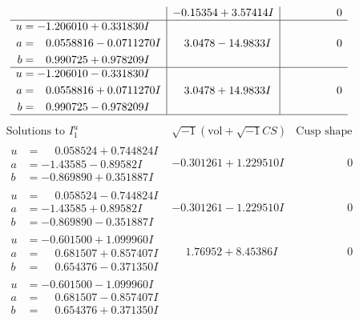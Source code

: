 \documentclass[1p]{elsarticle_modified}
\theoremstyle{definition}
\newcommand{\I}{\sqrt{-1}}
\begin{document}
$$\begin{array}{c|c|c}
 & -0.15354 + 3.57414 I & \phantom{-0.000000 } 0 \\ \hline\begin{aligned}
u &= -1.206010 + 0.331830 I \\
a &= \phantom{-}0.0558816 - 0.0711270 I \\
b &= \phantom{-}0.990725 + 0.978209 I\end{aligned}
 & \phantom{-}3.0478 - 14.9833 I & \phantom{-0.000000 } 0 \\ \hline\begin{aligned}
u &= -1.206010 - 0.331830 I \\
a &= \phantom{-}0.0558816 + 0.0711270 I \\
b &= \phantom{-}0.990725 - 0.978209 I\end{aligned}
 & \phantom{-}3.0478 + 14.9833 I & \phantom{-0.000000 } 0\\
 \hline 
 \end{array}$$\newpage$$\begin{array}{c|c|c}  
\text{Solutions to }I^u_{1}& \I (\text{vol} + \sqrt{-1}CS) & \text{Cusp shape}\\
 \hline 
\begin{aligned}
u &= \phantom{-}0.058524 + 0.744824 I \\
a &= -1.43585 - 0.89582 I \\
b &= -0.869890 + 0.351887 I\end{aligned}
 & -0.301261 + 1.229510 I & \phantom{-0.000000 } 0 \\ \hline\begin{aligned}
u &= \phantom{-}0.058524 - 0.744824 I \\
a &= -1.43585 + 0.89582 I \\
b &= -0.869890 - 0.351887 I\end{aligned}
 & -0.301261 - 1.229510 I & \phantom{-0.000000 } 0 \\ \hline\begin{aligned}
u &= -0.601500 + 1.099960 I \\
a &= \phantom{-}0.681507 + 0.857407 I \\
b &= \phantom{-}0.654376 - 0.371350 I\end{aligned}
 & \phantom{-}1.76952 + 8.45386 I & \phantom{-0.000000 } 0 \\ \hline\begin{aligned}
u &= -0.601500 - 1.099960 I \\
a &= \phantom{-}0.681507 - 0.857407 I \\
b &= \phantom{-}0.654376 + 0.371350 I\end{aligned}

\end{array}$$
\end{document}
